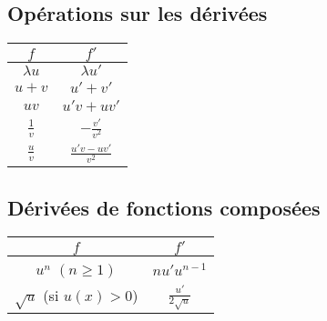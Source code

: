 \documentclass[a4paper]{article}
\begin{document}
\subsection{Opérations sur les dérivées}
\begin{center}
	\begin{tabular}{|c|c|}
  		\hline
  		$f$ & $f\prime$ \\
  		\hline
  		$\lambda u$ & $\lambda u\prime$ \\
  		\hline
  		$u + v$ & $u\prime + v\prime$ \\
  		\hline
  		$uv$ & $u\prime v + uv\prime$ \\
  		\hline
  		$\frac{1}{v}$ & $-\frac{v\prime}{v^2}$ \\
  		\hline
  		$\frac{u}{v}$ & $\frac{u\prime v - uv\prime}{v^2}$ \\
  		\hline
  	\end{tabular}
\end{center}

\subsection{Dérivées de fonctions composées}
\begin{center}
	\begin{tabular}{|c|c|}
  		\hline
  		$f$ & $f\prime$ \\
  		\hline
  		$u^n$ $(n \geq 1)$ & $nu\prime u^{n-1}$ \\
  		\hline
  		$\sqrt{u}$ (si $u(x) > 0$) & $\frac{u\prime}{2\sqrt{u}}$ \\
  		\hline
  	\end{tabular}
\end{center}
\end{document}
